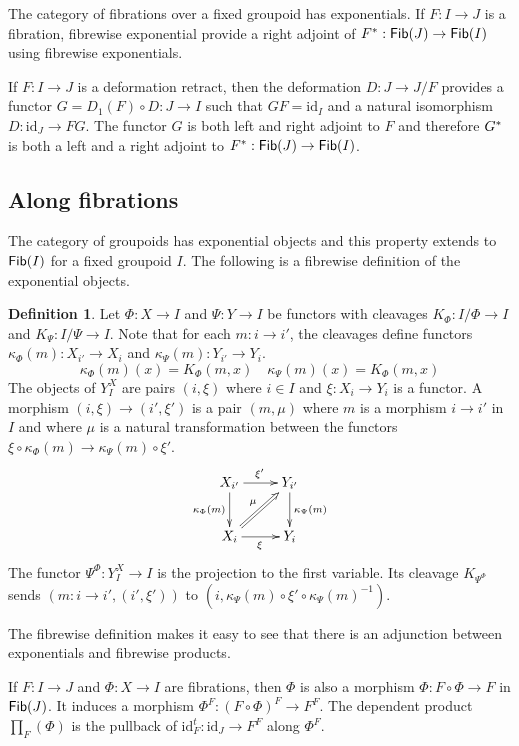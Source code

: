 \documentclass{amsart}
\theoremstyle{plain}
\theoremstyle{definition}
\newtheorem{defin}[theorem]{Definition}
\newcommand\hide[1]{}
\newcommand\id{\mathrm{id}}
\begin{document}
The category of fibrations over a fixed groupoid has exponentials. If $F:I\to J$ is a fibration, fibrewise exponential provide a right adjoint of $F^*:\mathsf{Fib}(J)\to\mathsf{Fib}(I)$ using fibrewise exponentials.

If $F:I\to J$ is a deformation retract, then the deformation $D:J\to J/F$ provides a functor $G = D_1(F)\circ D:J\to I$ such that $GF = \id_I$ and a natural isomorphism $D:\id_J \to FG$. The functor $G$ is both left and right adjoint to $F$ and therefore $G^*$ is both a left and a right adjoint to $F^*:\mathsf{Fib}(J) \to \mathsf{Fib}(I)$. %

\subsection{Along fibrations}
The category of groupoids has exponential objects and this property extends to $\mathsf{Fib}(I)$ for a fixed groupoid $I$. The following is a fibrewise definition of the exponential objects.


\begin{defin} Let $\Phi:X\to I$ and $\Psi: Y\to I$ be functors with cleavages $K_\Phi:I/\Phi \to I$ and $K_\Psi:I/\Psi \to I$. Note that for each $m:i\to i'$, the cleavages define functors $\kappa_\Phi(m):X_{i'} \to X_i$ and $\kappa_\Psi(m):Y_{i'}\to Y_i$.
\[ \kappa_\Phi(m)(x) = K_\Phi(m,x)\quad \kappa_\Psi(m)(x) = K_\Phi(m,x) \]
The objects of $Y^X_I$ are pairs $(i,\xi)$ where $i\in I$ and $\xi:X_i \to Y_i$ is a functor. A morphism $(i,\xi) \to (i',\xi')$ is a pair $(m,\mu)$ where $m$ is a morphism $i\to i'$ in $I$ and where $\mu$ is a natural transformation between the functors $\xi\circ \kappa_\Phi(m) \to \kappa_\Psi(m)\circ\xi'$.
\[\xymatrix{
X_{i'}\ar[d]_{\kappa_\Phi(m)}\ar[r]^{\xi'} & Y_{i'}\ar[d]^{\kappa_\Psi(m)} \\
X_i \ar[r]_{\xi} \ar@{=>}[ur]^\mu & Y_i
}\]
The functor $\Psi^\Phi:Y^X_I \to I$ is the projection to the first variable. Its cleavage $K_{\Psi^\Phi}$ sends $(m: i\to i', (i', \xi'))$ to $(i, \kappa_\Psi(m)\circ \xi'\circ \kappa_\Psi(m)^{-1})$.
\end{defin}\hide{Heb ik hier de juiste volgorde te pakken?}

The fibrewise definition makes it easy to see that there is an adjunction between exponentials and fibrewise products.

If $F:I\to J$ and $\Phi:X\to I$ are fibrations, then $\Phi$ is also a morphism $\Phi: F\circ \Phi  \to F$ in $\mathsf{Fib}(J)$. It induces a morphism $\Phi^F: (F\circ \Phi)^F  \to F^F$. The dependent product $\prod_{F}(\Phi)$ is the pullback of $\id_F^t:\id_J\to F^F$ along $\Phi^F$.\hide{verder uitwerken?}
\end{document}
